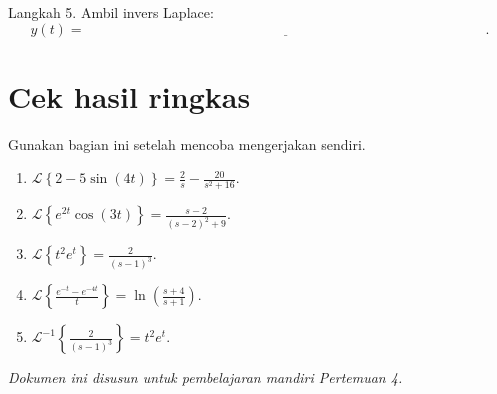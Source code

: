 \documentclass[11pt,a4paper]{article}
\newcommand{\Lcal}{\mathcal{L}}
\newcommand{\Lap}[1]{\Lcal\left\{#1\right\}}
\newcommand{\invLap}[1]{\Lcal^{-1}\left\{#1\right\}}
\begin{document}
Langkah 5. Ambil invers Laplace:
\[
y(t)=\underline{\hspace{12cm}}.
\]

\newpage
\section*{Cek hasil ringkas}
Gunakan bagian ini setelah mencoba mengerjakan sendiri.

\begin{enumerate}
    \item $\displaystyle \Lap{2-5\sin(4t)}=\frac{2}{s}-\frac{20}{s^2+16}$.
    \item $\displaystyle \Lap{e^{2t}\cos(3t)}=\frac{s-2}{(s-2)^2+9}$.
    \item $\displaystyle \Lap{t^2e^t}=\frac{2}{(s-1)^3}$.
    \item $\displaystyle \Lap{\frac{e^{-t}-e^{-4t}}{t}}=\ln\left(\frac{s+4}{s+1}\right)$.
    \item $\displaystyle \invLap{\frac{2}{(s-1)^3}}=t^2e^t$.
\end{enumerate}

\vfill
\begin{center}
\textit{Dokumen ini disusun untuk pembelajaran mandiri Pertemuan 4.}
\end{center}
\end{document}

